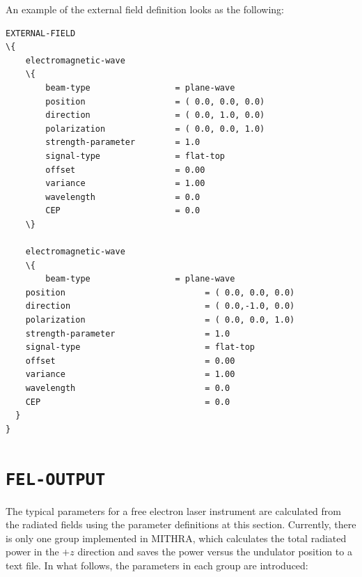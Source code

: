 An example of the external field definition looks as the following:
%
\begin{snugshade}
\begin{Verbatim}[fontsize=\small, tabsize=4, fontfamily=courier, fontseries=b, commandchars=\\\{\}, obeytabs]
EXTERNAL-FIELD
\{
	electromagnetic-wave
	\{
		beam-type				  = plane-wave
		position				  = ( 0.0, 0.0, 0.0)
    	direction				  = ( 0.0, 1.0, 0.0)
    	polarization			  = ( 0.0, 0.0, 1.0)
    	strength-parameter		  = 1.0
    	signal-type				  = flat-top
    	offset					  = 0.00
    	variance				  = 1.00
    	wavelength				  = 0.0
    	CEP						  = 0.0
	\}
	
	electromagnetic-wave
	\{
		beam-type				  = plane-wave
    position                            = ( 0.0, 0.0, 0.0)
    direction                           = ( 0.0,-1.0, 0.0)
    polarization                        = ( 0.0, 0.0, 1.0)
    strength-parameter                  = 1.0
    signal-type                         = flat-top
    offset                              = 0.00
    variance                            = 1.00
    wavelength                          = 0.0
    CEP                                 = 0.0
  }
}
\end{Verbatim}
\end{snugshade}
%

\section{\texttt{FEL-OUTPUT}}

The typical parameters for a free electron laser instrument are calculated from the radiated fields using the parameter definitions at this section.
%
Currently, there is only one group implemented in MITHRA, which calculates the total radiated power in the $+z$ direction and saves the power versus the undulator position to a text file.
%
In what follows, the parameters in each group are introduced:

